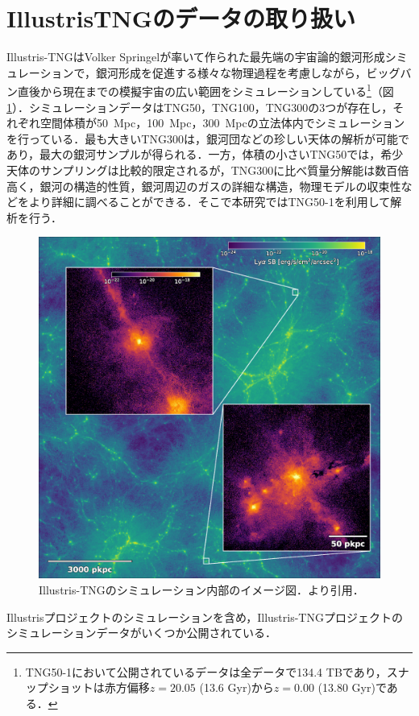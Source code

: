 \section{IllustrisTNGのデータの取り扱い}

Illustris-TNGはVolker Springelが率いて作られた最先端の宇宙論的銀河形成シミュレーションで，銀河形成を促進する様々な物理過程を考慮しながら，ビッグバン直後から現在までの模擬宇宙の広い範囲をシミュレーションしている\footnote{TNG50-1において公開されているデータは全データで134.4 TBであり，スナップショットは赤方偏移$z=20.05$ (13.6 Gyr)から$z=0.00$ (13.80 Gyr)である．}（図\ref{fig:TNG50_z3_LymanAlpha_emission_2k}）．シミュレーションデータはTNG50，TNG100，TNG300の3つが存在し，それぞれ空間体積が\SI{50}{Mpc}，\SI{100}{Mpc}，\SI{300}{Mpc}の立法体内でシミュレーションを行っている．最も大きいTNG300は，銀河団などの珍しい天体の解析が可能であり，最大の銀河サンプルが得られる．一方，体積の小さいTNG50では，希少天体のサンプリングは比較的限定されるが，TNG300に比べ質量分解能は数百倍高く，銀河の構造的性質，銀河周辺のガスの詳細な構造，物理モデルの収束性などをより詳細に調べることができる．そこで本研究ではTNG50-1を利用して解析を行う．

\begin{figure}[htbp]
	\centering
	\includegraphics[width=0.7\linewidth]{./pic/TNG50_z3_LymanAlpha_emission_2k.png}
	\caption{Illustris-TNGのシミュレーション内部のイメージ図．\citep{byrohl_physical_2021}より引用．}
	\label{fig:TNG50_z3_LymanAlpha_emission_2k}
\end{figure}

Illustrisプロジェクトのシミュレーションを含め，Illustris-TNGプロジェクトのシミュレーションデータがいくつか公開されている．

